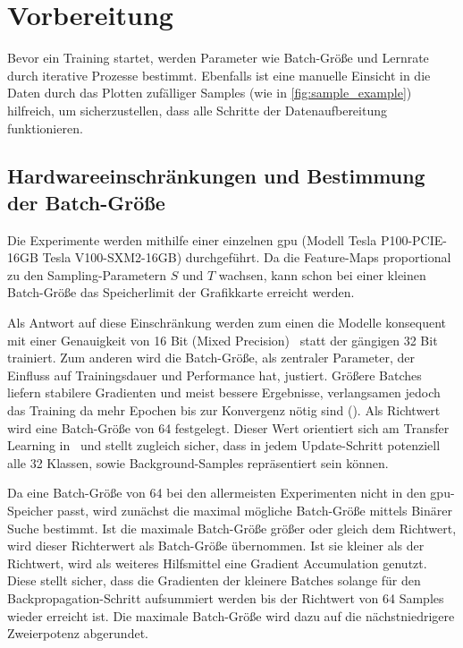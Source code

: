 \section{Vorbereitung}
\label{sec:vorbereitung}

Bevor ein Training startet, werden Parameter wie Batch-Größe und Lernrate durch iterative Prozesse bestimmt.
Ebenfalls ist eine manuelle Einsicht in die Daten durch das Plotten zufälliger Samples (wie in \autoref{fig:sample_example}) hilfreich, um sicherzustellen, dass alle Schritte der Datenaufbereitung funktionieren.

\subsection{Hardwareeinschränkungen und Bestimmung der Batch-Größe}
\label{subsec:hardwareeinschrankungen}

Die Experimente werden mithilfe einer einzelnen \gls{gpu} (Modell Tesla P100-PCIE-16GB \bzw Tesla V100-SXM2-16GB) durchgeführt.
Da die Feature-Maps proportional zu den Sampling-Parametern $S$ und $T$ wachsen, kann schon bei einer kleinen Batch-Größe das Speicherlimit der Grafikkarte erreicht werden.

Als Antwort auf diese Einschränkung werden zum einen die Modelle konsequent mit einer Genauigkeit von 16 Bit (Mixed Precision)~\cite{Micikevicius18} statt der gängigen 32 Bit trainiert.
Zum anderen wird die Batch-Größe, als zentraler Parameter, der Einfluss auf Trainingsdauer und Performance hat, justiert.
Größere Batches liefern stabilere Gradienten und meist bessere Ergebnisse, verlangsamen jedoch das Training da mehr Epochen bis zur Konvergenz nötig sind (\cite{Gugger20}).
Als Richtwert wird eine Batch-Größe von 64 festgelegt.
Dieser Wert orientiert sich am Transfer Learning in~\cite{Feichtenhofer18} und stellt zugleich sicher, dass in jedem Update-Schritt potenziell alle 32 Klassen, sowie Background-Samples repräsentiert sein können.

Da eine Batch-Größe von 64 bei den allermeisten Experimenten nicht in den \gls{gpu}-Speicher passt, wird zunächst die maximal mögliche Batch-Größe mittels Binärer Suche bestimmt.
Ist die maximale Batch-Größe größer oder gleich dem Richtwert, wird dieser Richterwert als Batch-Größe übernommen.
Ist sie kleiner als der Richtwert, wird als weiteres Hilfsmittel eine Gradient Accumulation genutzt.
Diese stellt sicher, dass die Gradienten der kleinere Batches solange für den Backpropagation-Schritt aufsummiert werden bis der Richtwert von 64 Samples wieder erreicht ist.
Die maximale Batch-Größe wird dazu auf die nächstniedrigere Zweierpotenz abgerundet.

